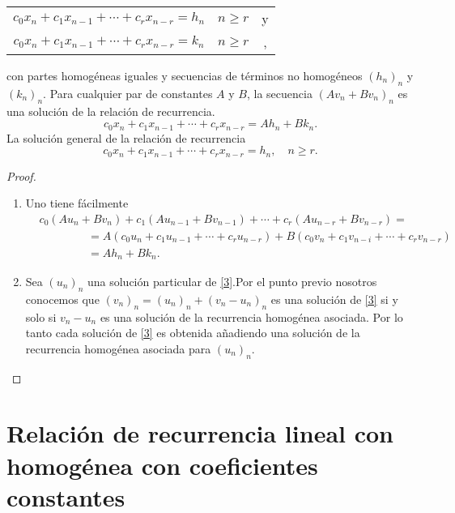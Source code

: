 \begin{tabular}{ccc}
	$c_{0}x_{n}+c_{1}x_{n-1}+\cdots+c_{r}x_{n-r}=h_{n}$	&	$n\geq r$	&	y\\
	$c_{0}x_{n}+c_{1}x_{n-1}+\cdots+c_{r}x_{n-r}=k_{n}$	&	$n\geq r$	&,\\
\end{tabular}

con partes homogéneas iguales y secuencias de términos no homogéneos $(h_{n})_{n}$ y $(k_{n})_{n}$. Para cualquier par de constantes $A$ y $B$, la secuencia $(Av_{n}+Bv_{n})_{n}$ es una solución de la relación de recurrencia.
\begin{equation*}
	c_{0}x_{n}+c_{1}x_{n-1}+\cdots+c_{r}x_{n-r}=Ah_{n}+Bk_{n}.
\end{equation*}
La solución general de la relación de recurrencia
\begin{equation}\label{3}
	c_{0}x_{n}+c_{1}x_{n-1}+\cdots+c_{r}x_{n-r}=h_{n},\quad n\geq r.
\end{equation}

\begin{proof}\leavevmode
	\begin{enumerate}
		\item Uno tiene fácilmente
			\begin{equation*}
				\begin{split}
					&c_{0}(Au_{n}+Bv_{n})+c_{1}(Au_{n-1}+Bv_{n-1})+\cdots+c_{r}(Au_{n-r}+Bv_{n-r})=\\
					&\phantom{c_{0}(Au_n+}=A(c_{0}u_{n}+c_{1}u_{n-1}+\cdots+c_{r}u_{n-r})+B(c_{0}v_{n}+c_{1}v_{n-i}+\cdots+c_{r}v_{n-r})\\
					&\phantom{c_{0}(Au_n+}=Ah_{n}+Bk_{n}.
				\end{split}
			\end{equation*}
		\item Sea $(u_{n})_{n}$ una solución particular de \eqref{3}.Por el punto previo nosotros conocemos que $(v_{n})_{n}=(u_{n})_{n}+(v_{n}-u_{n})_{n}$ es una solución de \eqref{3} si y solo si $v_{n}-u_{n}$ es una solución de la recurrencia homogénea asociada. Por lo tanto cada solución de \eqref{3} es obtenida añadiendo una solución de la  recurrencia homogénea asociada para $(u_{n})_{n}$.
	\end{enumerate}
\end{proof}

\section{Relación de recurrencia lineal con homogénea con coeficientes constantes}

